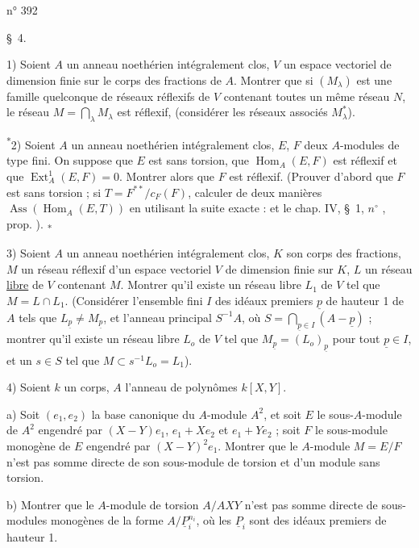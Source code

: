 \hfill n° 392

\S~4.

1) Soient $A$ un anneau noethérien intégralement clos, $V$ un espace vectoriel de dimension finie sur le corps des fractions de $A$. Montrer que si $(M_\lambda)$ est une famille quelconque de réseaux réflexifs de $V$ contenant toutes un même réseau $N$, le réseau $M=\bigcap_\lambda M_\lambda$ est réflexif, (considérer les réseaux associés $M_\lambda^*$).

\textsuperscript{*}2) Soient $A$ un anneau noethérien intégralement clos, $E$, $F$ deux $A$-modules de type fini. On suppose que $E$ est sans torsion, que $\operatorname{Hom}_A(E,F)$ est réflexif et que $\operatorname{Ext}_A^1(E,F)=0$. Montrer alors que $F$ est réflexif. (Prouver d'abord que $F$ est sans torsion ; si $T=F^{**}/c_F(F)$, calculer de deux manières $\operatorname{Ass}(\operatorname{Hom}_A(E,T))$ en utilisant la suite exacte :
et le chap. IV, \S~1, $n^{\circ}$ \quad, prop. \quad). \textsubscript{*}

3) Soient $A$ un anneau noethérien intégralement clos, $K$ son corps des fractions, $M$ un réseau réflexif d'un espace vectoriel $V$ de dimension finie sur $K$, $L$ un réseau \uline{libre} de $V$ contenant $M$. Montrer qu'il existe un réseau libre $L_1$ de $V$ tel que $M=L\cap L_1$. (Considérer l'ensemble fini $I$ des idéaux premiers $\underline{p}$ de hauteur 1 de $A$ tels que $L_{\underline{p}}\ne M_{\underline{p}}$, et l'anneau principal $S^{-1}A$, où $S=\bigcap_{\underline{p}\in I}(A-\underline{p})$ ; montrer qu'il existe un réseau libre $L_o$ de $V$ tel que $M_{\underline{p}}=(L_o)_{\underline{p}}$ pour tout $\underline{p}\in I$, et un $s\in S$ tel que $M\subset s^{-1}L_o=L_1$).

4) Soient $k$ un corps, $A$ l'anneau de polynômes $k[X,Y]$.

a) Soit $(e_1,e_2)$ la base canonique du $A$-module $A^2$, et soit $E$ le sous-$A$-module de $A^2$ engendré par $(X-Y)e_1$, $e_1+Xe_2$ et $e_1+Ye_2$ ; soit $F$ le sous-module monogène de $E$ engendré par $(X-Y)^2e_1$. Montrer que le $A$-module $M=E/F$ n'est pas somme directe de son sous-module de torsion et d'un module sans torsion.

b) Montrer que le $A$-module de torsion $A/AXY$ n'est pas somme directe de sous-modules monogènes de la forme $A/\underline{P}_i^{n_i}$, où les $\underline{P}_i$ sont des idéaux premiers de hauteur 1.

